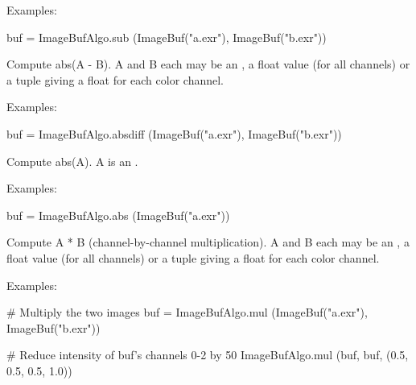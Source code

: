 \smallskip
\noindent Examples:
\begin{code}
    buf = ImageBufAlgo.sub (ImageBuf("a.exr"), ImageBuf("b.exr"))
\end{code}
\apiend


 

Compute {\cf abs(A - B)}.  {\cf A} and {\cf B} each may
be an \ImageBuf, a {\cf float} value (for all channels) or a tuple giving a
{\cf float} for each color channel.

\smallskip
\noindent Examples:
\begin{code}
    buf = ImageBufAlgo.absdiff (ImageBuf("a.exr"), ImageBuf("b.exr"))
\end{code}
\apiend


 

Compute {\cf abs(A)}.  {\cf A} is an \ImageBuf.

\smallskip
\noindent Examples:
\begin{code}
    buf = ImageBufAlgo.abs (ImageBuf("a.exr"))
\end{code}
\apiend


 

Compute {\cf A * B} (channel-by-channel multiplication). {\cf A} and {\cf B}
each may be an \ImageBuf, a {\cf float} value (for all channels) or a tuple
giving a {\cf float} for each color channel.

\smallskip
\noindent Examples:
\begin{code}
    # Multiply the two images
    buf = ImageBufAlgo.mul (ImageBuf("a.exr"), ImageBuf("b.exr"))

    # Reduce intensity of buf's channels 0-2 by 50%
    ImageBufAlgo.mul (buf, buf, (0.5, 0.5, 0.5, 1.0))
\end{code}
\apiend


 

